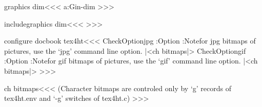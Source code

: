 \<graphics dim\><<< 
\csname a:Gin-dim\endcsname 
>>> 

\<includegraphics dim\><<< 
>>>

\<configure docbook tex4ht\><<< 
\:CheckOption{jpg} \if:Option 
\else 
   \Log:Note{for jpg bitmaps of pictures, use the `jpg' 
       command line option. |<ch bitmaps|>} 
\fi 
\:CheckOption{gif} \if:Option  
\else 
   \Log:Note{for gif bitmaps of pictures, use the `gif' 
       command line option. |<ch bitmaps|>} 
\fi 
>>> 
 
\<ch bitmaps\><<< 
(Character bitmaps are controled only by `g' records of tex4ht.env and `-g' 
switches of tex4ht.c) 
>>> 

\endinput
